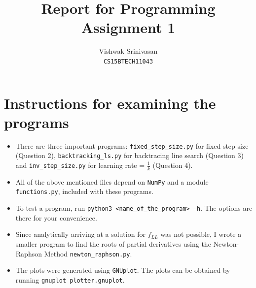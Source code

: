 \documentclass{article}
\title{Report for Programming Assignment 1}
\author{Vishwak Srinivasan\\
\texttt{CS15BTECH11043}}
\date{}
\begin{document}
\maketitle

\section*{Instructions for examining the programs}
\begin{itemize}
\item There are three important programs: \texttt{fixed\_step\_size.py} for fixed step size (Question 2), \texttt{backtracking\_ls.py} for backtracing line search (Question 3) and \texttt{inv\_step\_size.py} for learning rate = \(\frac{1}{k}\) (Question 4).
\item All of the above mentioned files depend on \texttt{NumPy} and a module \texttt{functions.py}, included with these programs.
\item To test a program, run \texttt{python3 <name\_of\_the\_program> -h}. The options are there for your convenience.
\item Since analytically arriving at a solution for \(f_{LL}\) was not possible, I wrote a smaller program to find the roots of partial derivatives using the Newton-Raphson Method \texttt{newton\_raphson.py}. 
\item The plots were generated using \texttt{GNUplot}. The plots can be obtained by running \texttt{gnuplot plotter.gnuplot}.
\end{itemize}
\end{document}
